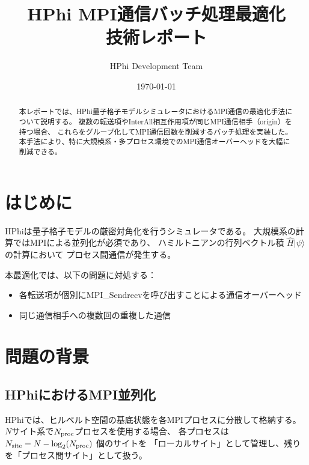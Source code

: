 \documentclass[11pt,a4paper]{article}
\title{HPhi MPI通信バッチ処理最適化\\
\large 技術レポート}
\author{HPhi Development Team}
\date{\today}
\begin{document}
\maketitle

\begin{abstract}
本レポートでは、HPhi量子格子モデルシミュレータにおけるMPI通信の最適化手法について説明する。
複数の転送項やInterAll相互作用項が同じMPI通信相手（origin）を持つ場合、
これらをグループ化してMPI通信回数を削減するバッチ処理を実装した。
本手法により、特に大規模系・多プロセス環境でのMPI通信オーバーヘッドを大幅に削減できる。
\end{abstract}

\tableofcontents
\newpage

\section{はじめに}

HPhiは量子格子モデルの厳密対角化を行うシミュレータである。
大規模系の計算ではMPIによる並列化が必須であり、
ハミルトニアンの行列ベクトル積 $\hat{H}|\psi\rangle$ の計算において
プロセス間通信が発生する。

本最適化では、以下の問題に対処する：
\begin{itemize}
  \item 各転送項が個別にMPI\_Sendrecvを呼び出すことによる通信オーバーヘッド
  \item 同じ通信相手への複数回の重複した通信
\end{itemize}

\section{問題の背景}

\subsection{HPhiにおけるMPI並列化}

HPhiでは、ヒルベルト空間の基底状態を各MPIプロセスに分散して格納する。
$N$サイト系で$N_{\rm proc}$プロセスを使用する場合、
各プロセスは $N_{\rm site} = N - \log_2(N_{\rm proc})$ 個のサイトを
「ローカルサイト」として管理し、残りを「プロセス間サイト」として扱う。
\end{document}
